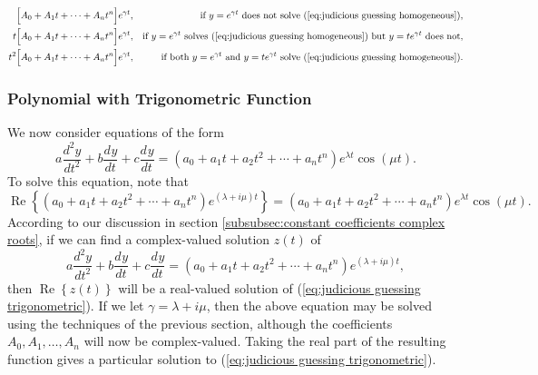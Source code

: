 \documentclass{myart}
\newcommand{\eq}[1]{(\ref{eq:#1})}
\newcommand{\deriv}[3][]{\frac{d^{#1}#2}{d#3^{#1}}}
\DeclareMathOperator{\OpRe}{Re}
\renewcommand{\Re}[1]{\OpRe\left\{#1\right\}}
\begin{document}
\begin{align*}
\Big[A_0 + A_1t + \cdots + A_nt^n\Big] e^{\gamma t}, && \text{if $y = e^{\gamma t}$ does not solve \eq{judicious guessing homogeneous}}, \\
t\Big[A_0 + A_1t + \cdots + A_nt^n\Big] e^{\gamma t}, && \text{if $y = e^{\gamma t}$ solves \eq{judicious guessing homogeneous} but $y = te^{\gamma t}$ does not}, \\
t^2\Big[A_0 + A_1t + \cdots + A_nt^n\Big] e^{\gamma t}, && \text{if both $y = e^{\gamma t}$ and $y = te^{\gamma t}$ solve \eq{judicious guessing homogeneous}}.
\end{align*}

\subsubsection{Polynomial with Trigonometric Function} \label{subsubsec:judicious guessing trigonometric}

We now consider equations of the form
\begin{equation} \label{eq:judicious guessing trigonometric}
a \deriv[2]{y}{t} + b \deriv{y}{t} + c \deriv{y}{t} = (a_0 + a_1t + a_2t^2 + \cdots + a_nt^n) e^{\lambda t} \cos(\mu t).
\end{equation}
To solve this equation, note that
\begin{equation*}
\Re{(a_0 + a_1t + a_2t^2 + \cdots + a_nt^n) e^{(\lambda + i \mu) t}} = (a_0 + a_1t + a_2t^2 + \cdots + a_nt^n) e^{\lambda t} \cos(\mu t).
\end{equation*}
According to our discussion in section \ref{subsubsec:constant coefficients complex roots}, if we can find a complex-valued solution $z(t)$ of
\begin{equation*}
a \deriv[2]{y}{t} + b \deriv{y}{t} + c \deriv{y}{t} = (a_0 + a_1t + a_2t^2 + \cdots + a_nt^n) e^{(\lambda + i \mu) t},
\end{equation*}
then $\Re{z(t)}$ will be a real-valued solution of \eq{judicious guessing trigonometric}. If we let $\gamma = \lambda + i \mu$, then the above equation may be solved using the techniques of the previous section, although the coefficients $A_0, A_1, \ldots, A_n$ will now be complex-valued. Taking the real part of the resulting function gives a particular solution to \eq{judicious guessing trigonometric}.
\end{document}
